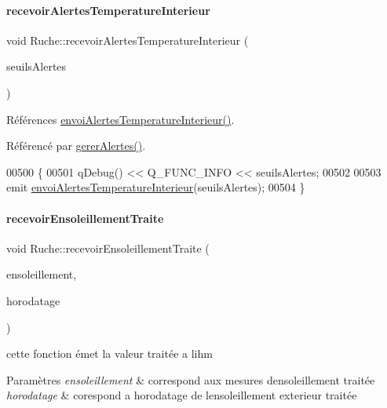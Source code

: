 \paragraph{\texorpdfstring{recevoir\+Alertes\+Temperature\+Interieur}{recevoirAlertesTemperatureInterieur}}
{\footnotesize\ttfamily void Ruche\+::recevoir\+Alertes\+Temperature\+Interieur (\begin{DoxyParamCaption}\item[{\hyperlink{parametres_8h_aaa6de8207c94675264c90b10b613368d}{Seuils\+Alertes}}]{seuils\+Alertes }\end{DoxyParamCaption})\hspace{0.3cm}{\ttfamily [slot]}}



Références \hyperlink{class_ruche_ac2f37831cb8c70ac4df2a3ac805b728b}{envoi\+Alertes\+Temperature\+Interieur()}.



Référencé par \hyperlink{class_ruche_a80f3538f081aea887d7199f114dfca01}{gerer\+Alertes()}.


\begin{DoxyCode}
00500 \{
00501     qDebug() << Q\_FUNC\_INFO << seuilsAlertes;
00502 
00503     emit \hyperlink{class_ruche_ac2f37831cb8c70ac4df2a3ac805b728b}{envoiAlertesTemperatureInterieur}(seuilsAlertes);
00504 \}
\end{DoxyCode}
\mbox{\label{class_ruche_a581320fbd44c1752d10aa0e6e533863c}} 
\paragraph{\texorpdfstring{recevoir\+Ensoleillement\+Traite}{recevoirEnsoleillementTraite}}
{\footnotesize\ttfamily void Ruche\+::recevoir\+Ensoleillement\+Traite (\begin{DoxyParamCaption}\item[{double}]{ensoleillement,  }\item[{Q\+String}]{horodatage }\end{DoxyParamCaption})\hspace{0.3cm}{\ttfamily [slot]}}

cette fonction émet la valeur traitée a l\textquotesingle{}ihm 
\begin{DoxyParams}{Paramètres}
{\em ensoleillement} & correspond aux mesures d\textquotesingle{}ensoleillement traitée \\
\hline
{\em horodatage} & corespond a horodatage de l\textquotesingle{}ensoleillement exterieur traitée \\
\hline
\end{DoxyParams}


